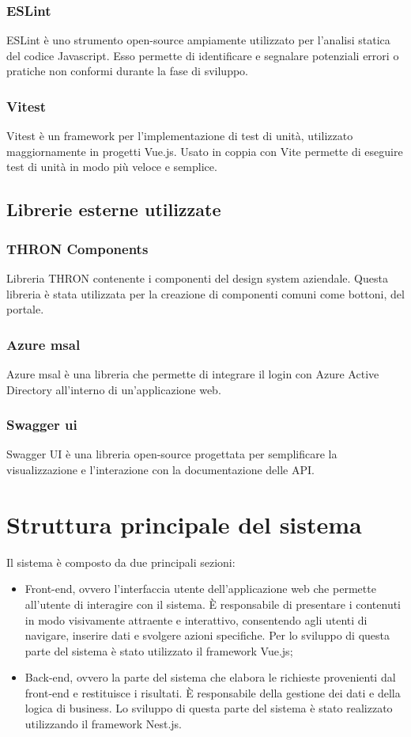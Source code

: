 \subsubsection{ESLint}\label{subsubsec:eslint}
ESLint è uno strumento open-source ampiamente utilizzato per l'analisi statica del codice Javascript. Esso permette di identificare e segnalare potenziali errori o pratiche non conformi durante la fase di sviluppo.
\subsubsection{Vitest}\label{subsubsec:vitest}
Vitest è un framework per l'implementazione di test di unità, utilizzato maggiornamente in progetti Vue.js.
Usato in coppia con Vite permette di eseguire test di unità in modo più veloce e semplice.

\subsection{Librerie esterne utilizzate}\label{subsec:librerie-esterne}
\subsubsection{THRON Components}\label{subsubsec:thron-components}
Libreria THRON contenente i componenti del design system aziendale. Questa libreria è stata utilizzata per la creazione di componenti comuni come bottoni, del portale.
\subsubsection{Azure msal}\label{subsubsec:azure-msal}
Azure msal è una libreria che permette di integrare il login con Azure Active Directory all'interno di un'applicazione web.
\subsubsection{Swagger ui}\label{subsubsec:swagger-ui}
Swagger UI è una libreria open-source progettata per semplificare la visualizzazione e l'interazione con la documentazione delle API.

\section{Struttura principale del sistema}
Il sistema è composto da due principali sezioni:
\begin{itemize}
  \item Front-end, ovvero l'interfaccia utente dell'applicazione web che permette all'utente di interagire con il sistema. È responsabile di presentare i contenuti in modo visivamente attraente e interattivo, consentendo agli utenti di navigare, inserire dati e svolgere azioni specifiche. Per lo
  sviluppo di questa parte del sistema è stato utilizzato il framework Vue.js;
  \item Back-end, ovvero la parte del sistema che elabora le richieste provenienti dal front-end e restituisce i risultati. È responsabile della gestione dei dati e della logica di business.
  Lo sviluppo di questa parte del sistema è stato realizzato utilizzando il framework Nest.js. 
\end{itemize}

